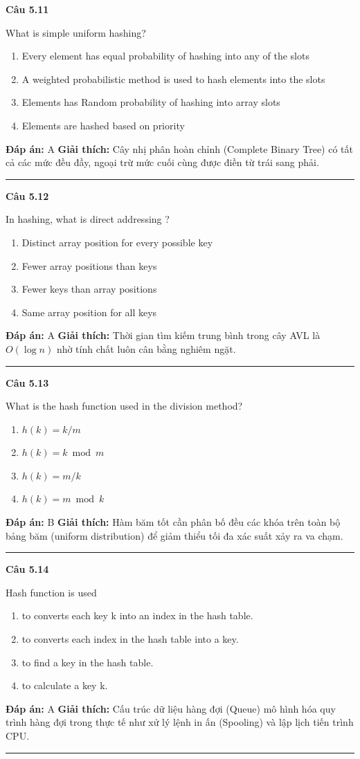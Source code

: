 \documentclass[11pt,a4paper]{article}
\newenvironment{question}[1]{%
  \par\vspace{1em}\noindent\textbf{\large Câu #1}\par\vspace{0.4em}
}{%
  \par\vspace{1em}\hrule\vspace{0.6em}
}
\newenvironment{choices}{%
  \begin{enumerate}[label=\textbf{\Alph*.},leftmargin=2.2em,itemsep=2pt,topsep=3pt]
}{%
  \end{enumerate}
}
\newcommand{\choice}{\item}
\begin{document}
\begin{question}{5.11}
What is simple uniform hashing?
\begin{choices}
\choice Every element has equal probability of hashing into any of the slots
\choice A weighted probabilistic method is used to hash elements into the slots
\choice Elements has Random probability of hashing into array slots
\choice Elements are hashed based on priority
\end{choices}
\textbf{Đáp án:} A
\textbf{Giải thích:} Cây nhị phân hoàn chỉnh (Complete Binary Tree) có tất cả các mức đều đầy, ngoại trừ mức cuối cùng được điền từ trái sang phải.
\end{question}

\begin{question}{5.12}
In hashing, what is direct addressing ?
\begin{choices}
\choice Distinct array position for every possible key
\choice Fewer array positions than keys
\choice Fewer keys than array positions
\choice Same array position for all keys
\end{choices}
\textbf{Đáp án:} A
\textbf{Giải thích:} Thời gian tìm kiếm trung bình trong cây AVL là \(O(\log n)\) nhờ tính chất luôn cân bằng nghiêm ngặt.
\end{question}

\begin{question}{5.13}
What is the hash function used in the division method?
\begin{choices}
\choice \(h(k) = k/m\)
\choice \(h(k) = k \bmod m\)
\choice \(h(k) = m/k\)
\choice \(h(k) = m \bmod k\)
\end{choices}
\textbf{Đáp án:} B
\textbf{Giải thích:} Hàm băm tốt cần phân bố đều các khóa trên toàn bộ bảng băm (uniform distribution) để giảm thiểu tối đa xác suất xảy ra va chạm.
\end{question}

\begin{question}{5.14}
Hash function is used
\begin{choices}
\choice to converts each key k into an index in the hash table.
\choice to converts each index in the hash table into a key.
\choice to find a key in the hash table.
\choice to calculate a key k.
\end{choices}
\textbf{Đáp án:} A
\textbf{Giải thích:} Cấu trúc dữ liệu hàng đợi (Queue) mô hình hóa quy trình hàng đợi trong thực tế như xử lý lệnh in ấn (Spooling) và lập lịch tiến trình CPU.
\end{question}
\end{document}
